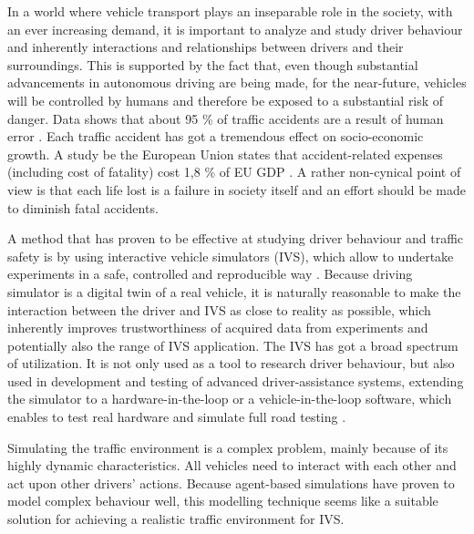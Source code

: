 \documentclass[titlepage, 12pt]{article}
\begin{document}
In a world where vehicle transport plays an inseparable role in the society, with an ever increasing
demand, it is important to analyze and study driver behaviour and inherently interactions and
relationships between drivers and their surroundings. This is supported by the fact that, even though
substantial advancements in autonomous driving are being made, for the near-future, vehicles 
will be controlled by humans and therefore be exposed to a substantial risk of danger. 
Data shows that about 95 \% of traffic accidents are a result of human error \cite{Parliament2021}. 
Each traffic accident has got a tremendous effect on socio-economic growth. A study be the European
Union states that accident-related expenses (including cost of fatality) cost 1,8 \% of EU GDP \cite{Wijnen2017}.  
A rather non-cynical point of view is that each life lost is a failure in society itself and an effort
should be made to diminish fatal accidents.

A method that has proven to be effective at studying driver behaviour and
traffic safety is by using interactive vehicle simulators (IVS), which allow to
undertake experiments in a safe, controlled and reproducible way \cite{Winter2012}.  Because
driving simulator is a digital twin of a real vehicle, it is naturally
reasonable to make the interaction between the driver and IVS as close to
reality as possible, which inherently improves trustworthiness of acquired data from experiments
and potentially also the range of IVS application. The IVS has got a broad
spectrum of utilization. It is not only used as a tool to research driver
behaviour, but also used in development and testing of advanced
driver-assistance systems, extending the simulator to a hardware-in-the-loop or
a vehicle-in-the-loop software, which enables to test real hardware and simulate
full road testing \cite{Horvath2019}.

Simulating the traffic environment is a complex problem, mainly because of
its highly dynamic characteristics. All vehicles  need to interact with
each other and act upon other drivers' actions. Because agent-based simulations
have proven to model complex behaviour well, this modelling technique seems like
a suitable solution for achieving a realistic traffic environment for IVS.



% 

% 

% 

% 

% 

% 

% 

\clearpage

\printbibliography
\end{document}
